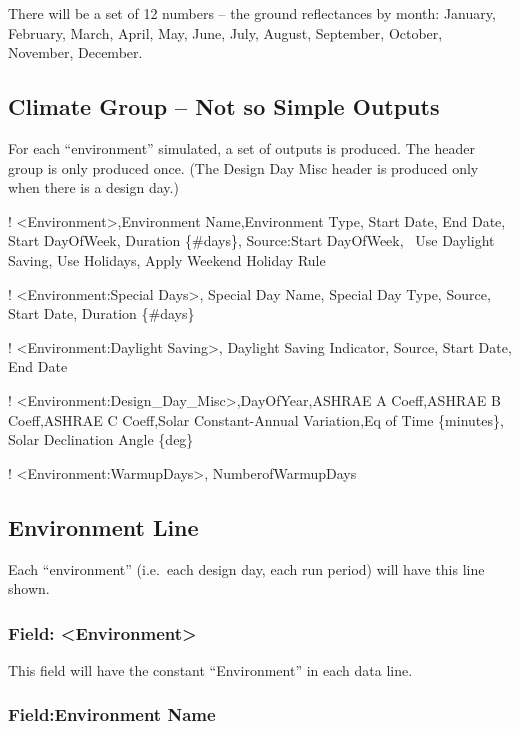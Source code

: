 There will be a set of 12 numbers -- the ground reflectances by month: January, February, March, April, May, June, July, August, September, October, November, December.

\subsection{Climate Group -- Not so Simple Outputs}\label{climate-group-not-so-simple-outputs}

For each ``environment'' simulated, a set of outputs is produced. The header group is only produced once. (The Design Day Misc header is produced only when there is a design day.)

! \textless{}Environment\textgreater{},Environment Name,Environment Type, Start Date, End Date, Start DayOfWeek, Duration \{\#days\}, Source:Start DayOfWeek,~ Use Daylight Saving, Use Holidays, Apply Weekend Holiday Rule

! \textless{}Environment:Special Days\textgreater{}, Special Day Name, Special Day Type, Source, Start Date, Duration \{\#days\}

! \textless{}Environment:Daylight Saving\textgreater{}, Daylight Saving Indicator, Source, Start Date, End Date

! \textless{}Environment:Design\_Day\_Misc\textgreater{},DayOfYear,ASHRAE A Coeff,ASHRAE B Coeff,ASHRAE C Coeff,Solar Constant-Annual Variation,Eq of Time \{minutes\}, Solar Declination Angle \{deg\}

! \textless{}Environment:WarmupDays\textgreater{}, NumberofWarmupDays

\subsection{Environment Line}\label{environment-line}

Each ``environment'' (i.e.~each design day, each run period) will have this line shown.

\subsubsection{Field: \textless{}Environment\textgreater{}}\label{field-environment}

This field will have the constant ``Environment'' in each data line.

\subsubsection{Field:Environment Name}\label{fieldenvironment-name}

